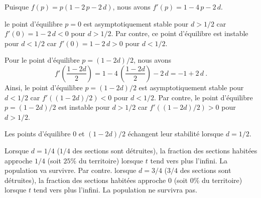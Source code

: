 { Puisque $f(p) = p(1-2\,p -2\,d)$, nous avons $f'(p) = 1-4\,p - 2\,d$.

le point d'équilibre $p=0$ est asymptotiquement stable pour
$d>1/2$ car $f'(0) = 1-2\,d < 0$ pour $d>1/2$.  Par contre,
ce point d'équilibre est instable pour
$d<1/2$ car $f'(0) = 1-2\,d > 0$ pour $d<1/2$.

Pour le point d'équilibre $p=(1-2d)/2$, nous avons
\[
f'\left(\frac{1-2d}{2}\right) = 1-4\,\left(\frac{1-2d}{2}\right) - 2\,d
= -1 + 2\,d \ .
\]
Ainsi, le point d'équilibre $p=(1-2d)/2$
est asymptotiquement stable pour $d<1/2$ car
$f'\left((1-2d)/2\right)<0$ pour $d<1/2$.  Par contre,
le point d'équilibre $p=(1-2d)/2$ est instable pour $d>1/2$ car
$f'\left((1-2d)/2\right)>0$ pour $d>1/2$.

Les points d'équilibre $0$ et $(1-2d)/2$ échangent leur stabilité
lorsque $d=1/2$.

 Lorsque $d=1/4$ ($1/4$ des sections sont détruites), la fraction des
sections habitées approche $1/4$ (soit $25$\% du territoire) lorsque $t$
tend vers plus l'infini.  La population va survivre.  Par contre. lorsque
$d=3/4$ ($3/4$ des sections sont détruites), la fraction des sections
habitées approche $0$ (soit $0$\% du territoire) lorsque $t$ tend vers
plus l'infini.  La population ne survivra pas.
}


